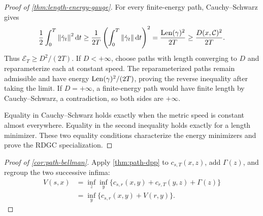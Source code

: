 \begin{proof}[Proof of \cref{thm:length-energy-gauge}]
For every finite-energy path, Cauchy--Schwarz gives
\[
  \frac12\int_0^T\left\lVert \dot\gamma_t\right\rVert^2\mathrm d t
  \ge
  \frac1{2T}\left(\int_0^T\left\lVert \dot\gamma_t\right\rVert\mathrm d t\right)^2
  =\frac{\operatorname{Len}(\gamma)^2}{2T}
  \ge\frac{D(x,\mathcal C)^2}{2T}.
\]
Thus \(\mathcal E_T\ge D^2/(2T)\).  If \(D<+\infty\), choose paths with
length converging to \(D\) and reparameterize each at constant speed.  The
reparameterized paths remain admissible and have energy
\(\operatorname{Len}(\gamma)^2/(2T)\), proving the reverse inequality after taking the
limit.  If \(D=+\infty\), a finite-energy path would have finite length by
Cauchy--Schwarz, a contradiction, so both sides are \(+\infty\).

Equality in Cauchy--Schwarz holds exactly when the metric speed is constant
almost everywhere.  Equality in the second inequality holds exactly for a
length minimizer.  These two equality conditions characterize the energy
minimizers and prove the RDGC specialization.
\end{proof}

\begin{proof}[Proof of \cref{cor:path-bellman}]
Apply \cref{thm:path-dpp} to \(c_{s,T}(x,z)\), add \(\Gamma(z)\), and regroup
the two successive infima:
\[
\begin{aligned}
V(s,x)
&=\inf_z\inf_y
\{c_{s,r}(x,y)+c_{r,T}(y,z)+\Gamma(z)\}\\
&=\inf_y\{c_{s,r}(x,y)+V(r,y)\}.
\end{aligned}
\]
\end{proof}

